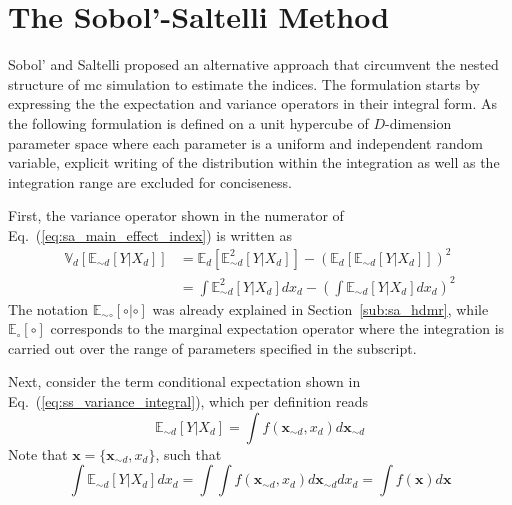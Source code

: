 \section{The Sobol'-Saltelli Method}\label{app:sobol_saltelli}

Sobol' \cite{Sobol2001} and Saltelli \cite{Saltelli2002} proposed an alternative approach that circumvent the nested structure of \gls{mc} simulation to estimate the indices.
The formulation starts by expressing the the expectation and variance operators in their integral form.
As the following formulation is defined on a unit hypercube of $D$-dimension parameter space where each parameter is a uniform and independent random variable,
explicit writing of the distribution within the integration as well as the integration range are excluded for conciseness.

First, the variance operator shown in the numerator of Eq.~(\ref{eq:sa_main_effect_index}) is written as
\begin{equation}
  \begin{split}
    \mathbb{V}_{d}[\mathbb{E}_{\sim d}[Y|X_d]] & = \mathbb{E}_{d}[\mathbb{E}_{\sim d}^{2}[Y|X_d]] - \left(\mathbb{E}_{d}[\mathbb{E}_{\sim d}[Y|X_d]]\right)^2 \\ 
                                               & = \int \mathbb{E}_{\sim d}^{2}[Y|X_d] dx_d - \left(\int \mathbb{E}_{\sim d}[Y|X_d] dx_d\right)^2
  \end{split}
\label{eq:ss_variance_integral}
\end{equation}
The notation $\mathbb{E}_{\sim \circ}[\circ | \circ]$ was already explained in Section~\ref{sub:sa_hdmr}, 
while $\mathbb{E}_{\circ} [\circ]$ corresponds to the marginal expectation operator 
where the integration is carried out over the range of parameters specified in the subscript. 

Next, consider the term conditional expectation shown in Eq.~(\ref{eq:ss_variance_integral}), which per definition reads
\begin{equation}
  \mathbb{E}_{\sim d} [Y|X_d] = \int f(\mathbf{x}_{\sim d}, x_d) d\mathbf{x}_{\sim d}
\label{eq:ss_expectation_integral}
\end{equation}
Note that $\mathbf{x} = \{\mathbf{x}_{\sim d}, x_d\}$, such that
\begin{equation}
  \int \mathbb{E}_{\sim d} [Y | X_d] dx_d = \int \int f(\mathbf{x}_{\sim d}, x_d) d\mathbf{x}_{\sim d} dx_{d} = \int f(\mathbf{x}) d\mathbf{x}
\label{eq:ss_expectation_expectation}
\end{equation}

